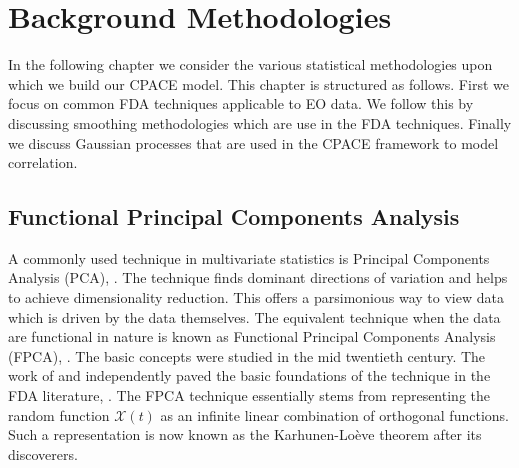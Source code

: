 
\chapter{Background Methodologies \label{cha:background}}  %


\ifpdf
    \graphicspath{{Chapter3/Figs/Raster/}{Chapter3/Figs/PDF/}{Chapter3/Figs/}}
\else
    \graphicspath{{Chapter3/Figs/Vector/}{Chapter3/Figs/}}
\fi

In the following chapter we consider the various statistical methodologies  upon which we build our CPACE model.
This chapter is structured as follows.
First we focus on common FDA techniques applicable to EO data.
We follow this by discussing smoothing methodologies which are use in the FDA techniques. 
Finally we discuss Gaussian processes that are used in the CPACE framework to model correlation. 

\section{Functional Principal Components Analysis \label{sec:fpca}}
A commonly used technique in multivariate statistics is Principal Components Analysis (PCA), \citep{wold_principal_1987}. 
The technique finds dominant directions of variation and helps to achieve dimensionality reduction.
This offers a parsimonious way to view data which is driven by the data themselves.
The equivalent technique when the data are functional in nature is known as Functional Principal Components Analysis (FPCA), \citep{ramsay_functional_2010}.
The basic concepts were studied in the mid twentieth century.
The work of \citeauthor{karhunen_zur_1946} and independently \citeauthor{loeve_fonctions_1946} paved the basic foundations of the technique in the FDA literature, \citep{karhunen_zur_1946, loeve_fonctions_1946}.
The FPCA technique essentially stems from representing the random function $\mathcal{X}(t)$ as an infinite linear combination of orthogonal functions.
Such a representation is now known as the Karhunen-Lo\`{e}ve theorem after its discoverers.

